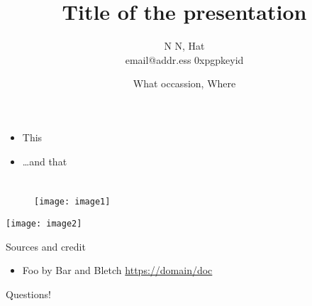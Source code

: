 \documentclass{beamer}
\title{Title of the presentation}
\subtitle{}
\author{N N, Hat \\ email@addr.ess 0xpgpkeyid}
\date[YYYY-MM-DD]{What occassion, Where}
\begin{document}
\begin{frame}
  \titlepage
\end{frame}

\section{}

\begin{frame}{}
  \begin{itemize}[<+->]
    \item This
    \item \dots and that
  \end{itemize}
\end{frame}

\section{}

\subsection{}

\begin{frame}{}
  \begin{figure}[ht]
    \texttt{[image: image1]}
  \end{figure}
\end{frame}

\begin{frame}{}
  \begin{center}
    \texttt{[image: image2]}
  \end{center}
\end{frame}

\begin{frame}{Sources and credit}
  \begin{itemize}
  \item Foo by Bar and Bletch \url{https://domain/doc}
  \end{itemize}
\end{frame}

\begin{frame}{}
  \begin{center}
    Questions!
  \end{center}
\end{frame}
\end{document}
